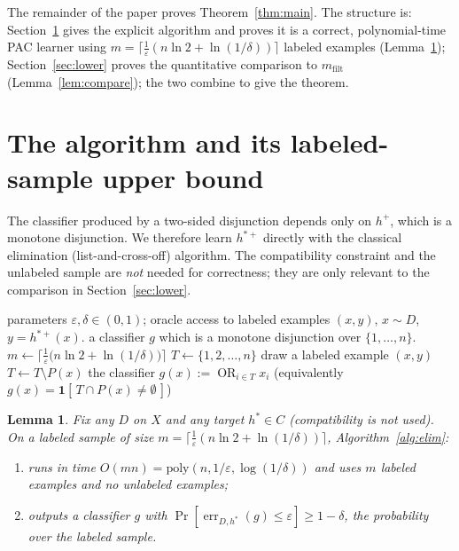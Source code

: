 \documentclass{amsart}
\newtheorem{lemma}{Lemma}
\theoremstyle{definition}
\DeclareMathOperator{\err}{err}
\DeclareMathOperator*{\OR}{OR}
\newcommand{\eps}{\varepsilon}
\begin{document}
The remainder of the paper proves Theorem~\ref{thm:main}. The structure is:
Section~\ref{sec:alg} gives the explicit algorithm and proves it is a correct,
polynomial-time PAC learner using $m=\lceil\frac1\eps(n\ln2+\ln(1/\delta))\rceil$
labeled examples (Lemma~\ref{lem:upper}); Section~\ref{sec:lower} proves the
quantitative comparison to $m_{\mathrm{filt}}$ (Lemma~\ref{lem:compare}); the
two combine to give the theorem.

\section{The algorithm and its labeled-sample upper bound}\label{sec:alg}

The classifier produced by a two-sided disjunction depends only on $h^+$, which
is a monotone disjunction. We therefore learn $h^{\ast+}$ directly with the
classical elimination (list-and-cross-off) algorithm. The compatibility
constraint and the unlabeled sample are \emph{not} needed for correctness; they
are only relevant to the comparison in Section~\ref{sec:lower}.

\begin{algorithm}[h]
\caption{Elimination learner for the classifier of $C$}\label{alg:elim}
\begin{algorithmic}[1]
  \Require parameters $\eps,\delta\in(0,1)$; oracle access to labeled examples
           $(x,y)$, $x\sim D$, $y=h^{\ast+}(x)$.
  \Ensure a classifier $g$ which is a monotone disjunction over $\{1,\dots,n\}$.
  \State $m \gets \bigl\lceil \tfrac1\eps\bigl(n\ln 2+\ln(1/\delta)\bigr)\bigr\rceil$
  \State $T \gets \{1,2,\dots,n\}$
     \State draw a labeled example $(x,y)$
      
        \State $T \gets T \setminus P(x)$
     \EndIf
  \EndFor
  \State \Return the classifier $g(x):=\OR_{i\in T} x_i$
         \big(equivalently $g(x)=\mathbf 1[\,T\cap P(x)\neq\emptyset\,]$\big)
\end{algorithmic}
\end{algorithm}

\begin{lemma}\label{lem:upper}
Fix any $D$ on $X$ and any target $h^\ast\in C$ (compatibility is not used).
On a labeled sample of size
$m=\lceil\frac1\eps(n\ln2+\ln(1/\delta))\rceil$, Algorithm~\ref{alg:elim}:
\begin{enumerate}
\item runs in time $O(mn)=\mathrm{poly}(n,1/\eps,\log(1/\delta))$ and uses $m$
labeled examples and no unlabeled examples;
\item outputs a classifier $g$ with
$\Pr[\err_{D,h^\ast}(g)\le\eps]\ge 1-\delta$,
the probability over the labeled sample.
\end{enumerate}
\end{lemma}
\end{document}
